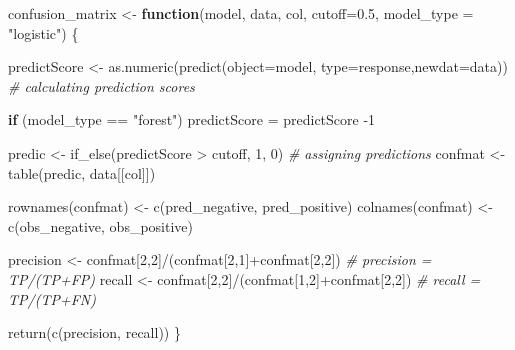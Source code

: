 \documentclass[
]{report}
\newenvironment{Shaded}{\begin{snugshade}}{\end{snugshade}}
\newcommand{\AttributeTok}[1]{\textcolor[rgb]{0.77,0.63,0.00}{#1}}
\newcommand{\CommentTok}[1]{\textcolor[rgb]{0.56,0.35,0.01}{\textit{#1}}}
\newcommand{\ControlFlowTok}[1]{\textcolor[rgb]{0.13,0.29,0.53}{\textbf{#1}}}
\newcommand{\DecValTok}[1]{\textcolor[rgb]{0.00,0.00,0.81}{#1}}
\newcommand{\FloatTok}[1]{\textcolor[rgb]{0.00,0.00,0.81}{#1}}
\newcommand{\FunctionTok}[1]{\textcolor[rgb]{0.00,0.00,0.00}{#1}}
\newcommand{\NormalTok}[1]{#1}
\newcommand{\OtherTok}[1]{\textcolor[rgb]{0.56,0.35,0.01}{#1}}
\newcommand{\SpecialCharTok}[1]{\textcolor[rgb]{0.00,0.00,0.00}{#1}}
\newcommand{\StringTok}[1]{\textcolor[rgb]{0.31,0.60,0.02}{#1}}
\begin{document}
\begin{Shaded}
\begin{Highlighting}[]
\NormalTok{confusion\_matrix }\OtherTok{\textless{}{-}} \ControlFlowTok{function}\NormalTok{(model, data, col, }\AttributeTok{cutoff=}\FloatTok{0.5}\NormalTok{, }\AttributeTok{model\_type =} \StringTok{"logistic"}\NormalTok{) \{}
  
\NormalTok{  predictScore }\OtherTok{\textless{}{-}} \FunctionTok{as.numeric}\NormalTok{(}\FunctionTok{predict}\NormalTok{(}\AttributeTok{object=}\NormalTok{model, }\AttributeTok{type=}\StringTok{\textquotesingle{}response\textquotesingle{}}\NormalTok{,}\AttributeTok{newdat=}\NormalTok{data)) }\CommentTok{\# calculating prediction scores}
  
  \ControlFlowTok{if}\NormalTok{ (model\_type }\SpecialCharTok{==} \StringTok{"forest"}\NormalTok{) predictScore }\OtherTok{=}\NormalTok{ predictScore }\SpecialCharTok{{-}}\DecValTok{1}
  
\NormalTok{  predic }\OtherTok{\textless{}{-}} \FunctionTok{if\_else}\NormalTok{(predictScore }\SpecialCharTok{\textgreater{}}\NormalTok{ cutoff, }\DecValTok{1}\NormalTok{, }\DecValTok{0}\NormalTok{) }\CommentTok{\# assigning predictions}
\NormalTok{  confmat }\OtherTok{\textless{}{-}} \FunctionTok{table}\NormalTok{(predic, data[[col]])}
  
  \FunctionTok{rownames}\NormalTok{(confmat) }\OtherTok{\textless{}{-}} \FunctionTok{c}\NormalTok{(}\StringTok{\textquotesingle{}pred\_negative\textquotesingle{}}\NormalTok{, }\StringTok{\textquotesingle{}pred\_positive\textquotesingle{}}\NormalTok{)}
  \FunctionTok{colnames}\NormalTok{(confmat) }\OtherTok{\textless{}{-}} \FunctionTok{c}\NormalTok{(}\StringTok{\textquotesingle{}obs\_negative\textquotesingle{}}\NormalTok{, }\StringTok{\textquotesingle{}obs\_positive\textquotesingle{}}\NormalTok{)}
  
\NormalTok{  precision }\OtherTok{\textless{}{-}}\NormalTok{ confmat[}\DecValTok{2}\NormalTok{,}\DecValTok{2}\NormalTok{]}\SpecialCharTok{/}\NormalTok{(confmat[}\DecValTok{2}\NormalTok{,}\DecValTok{1}\NormalTok{]}\SpecialCharTok{+}\NormalTok{confmat[}\DecValTok{2}\NormalTok{,}\DecValTok{2}\NormalTok{]) }\CommentTok{\# precision = TP/(TP+FP)}
\NormalTok{  recall }\OtherTok{\textless{}{-}}\NormalTok{ confmat[}\DecValTok{2}\NormalTok{,}\DecValTok{2}\NormalTok{]}\SpecialCharTok{/}\NormalTok{(confmat[}\DecValTok{1}\NormalTok{,}\DecValTok{2}\NormalTok{]}\SpecialCharTok{+}\NormalTok{confmat[}\DecValTok{2}\NormalTok{,}\DecValTok{2}\NormalTok{]) }\CommentTok{\# recall = TP/(TP+FN)}
  
  \FunctionTok{return}\NormalTok{(}\FunctionTok{c}\NormalTok{(precision, recall))}
\NormalTok{\}}
\end{Highlighting}
\end{Shaded}
\end{document}
